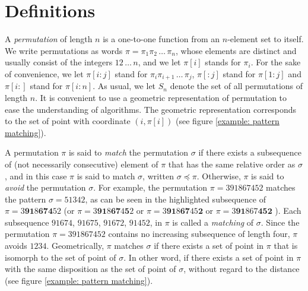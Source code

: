 \documentclass[a4paper]{llncs}
\DeclareMathOperator{\RED}{red}
\begin{document}

\section{Definitions}
\label{section:Definitions}

A \emph{permutation} of length $n$ is a one-to-one function from an
$n$-element set to itself.
We write permutations as words
$\pi = \pi_1\pi_2\,\ldots\,\pi_n$, whose elements are distinct
and usually consist of the integers $12\,\ldots\,n$, and we let
$\pi[i]$ stands for $\pi_i$.
For the sake of convenience, we let
$\pi[i:j]$ stand for
$\pi_i\pi_{i+1}\,\ldots\,\pi_j$,
$\pi[:j]$ stand for $\pi[1:j]$ and
$\pi[i:]$ stand for $\pi[i:n]$.
As usual, we let $S_n$ denote the set of all permutations of length $n$.
It is convenient to use a geometric representation of permutation
to ease the understanding of algorithms. 
The geometric representation corresponds to the set of point with coordinate $(i,\pi[i])$
(see figure \ref{example: pattern matching}).


A permutation $\pi$ is said to \emph{match} the permutation $\sigma$
if there exists a subsequence of (not necessarily consecutive)
element of $\pi$ that has the same relative order as $\sigma$,
and in this case $\pi$ is said to match $\sigma$, 
written $\sigma \preceq \pi$.
Otherwise, $\pi$ is said to \emph{avoid} the permutation $\sigma$.
For example, the permutation $\pi = 391867452$
matches the pattern $\sigma = 51342$,
as can be seen in the highlighted subsequence of
$\pi = 3\mathbf{9}\mathbf{1}8\mathbf{6}\mathbf{7}\mathbf{4}52$
(or
$\pi = 3\mathbf{9}\mathbf{1}8\mathbf{6}\mathbf{7}4\mathbf{5}2$
or
$\pi = 3\mathbf{9}\mathbf{1}8\mathbf{6}\mathbf{7}45\textbf{2}$
or
$\pi = 3\mathbf{9}\mathbf{1}867\textbf{4}\textbf{5}\mathbf{2}$
).
Each subsequence $91674$,
$91675$,
$91672$,
$91452$,
 in $\pi$ is called a
\emph{matching}
of $\sigma$.
Since the permutation $\pi = 391867452$  contains no increasing subsequence of
length four, $\pi$ avoids $1234$.
Geometrically, $\pi$ matches $\sigma$ if there exists
a set of point in $\pi$ that is isomorph to the set of point of $\sigma$. In other word,
if there exists a set of point in $\pi$ with the same disposition as the set of point of $\sigma$, without regard to the distance (see figure \ref{example: pattern matching}).
\end{document}
